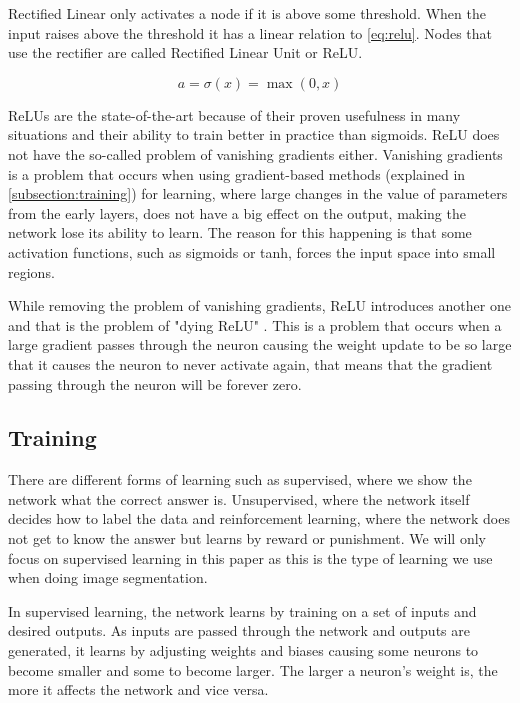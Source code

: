 Rectified Linear only activates a node if it is above some threshold. When the input raises above the threshold it has a linear relation to \autoref{eq:relu}. Nodes that use the rectifier are called Rectified Linear Unit or ReLU. 

\begin{equation}
\label{eq:relu}
a = \sigma(x) = \max(0, x)
\end{equation}


ReLUs are the state-of-the-art because of their proven usefulness in many situations and their ability to train better in practice than sigmoids. ReLU does not have the so-called problem of vanishing gradients either. Vanishing gradients is a problem that occurs when using gradient-based methods (explained in \autoref{subsection:training}) for learning, where large changes in the value of parameters from the early layers, does not have a big effect on the output, making the network lose its ability to learn. The reason for this happening is that some activation functions, such as sigmoids or tanh, forces the input space into small regions. 

While removing the problem of vanishing gradients, ReLU introduces another one and that is the problem of "dying ReLU" \cite{Li}. This is a problem that occurs when a large gradient passes through the neuron causing the weight update to be so large that it causes the neuron to never activate again, that means that the gradient passing through the neuron will be forever zero.


\subsection{Training}\label{subsection:training}
There are different forms of learning such as supervised, where we show the network what the correct answer is. Unsupervised, where the network itself decides how to label the data and reinforcement learning, where the network does not get to know the answer but learns by reward or punishment. We will only focus on supervised learning in this paper as this is the type of learning we use when doing image segmentation.

In supervised learning, the network learns by training on a set of inputs and desired outputs. As inputs are passed through the network and outputs are generated, it learns by adjusting weights and biases causing some neurons to become smaller and some to become larger. The larger a neuron's weight is, the more it affects the network and vice versa.

